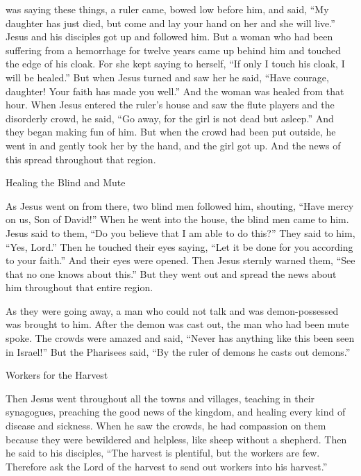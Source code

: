 {was saying
these things,
a ruler
came,
bowed low
before him,
and said,
“My
daughter
has
just
died,
but
come
and lay
your
hand
on
her
and
she will live.”
Jesus
and
his
disciples
got up
and
followed
him.
But
a woman
who had been suffering from a hemorrhage
for twelve
years
came up
behind
him and touched
the edge
of his
cloak.
For
she kept saying
to
herself, “If
only
I touch
his
cloak,
I will be healed.”
But
when Jesus
turned
and
saw
her
he said,
“Have courage,
daughter! Your
faith
has made
you
well.”
And
the woman
was healed
from
that
hour.
When
Jesus
entered
the ruler’s
house
and
saw
the flute players
and
the disorderly
crowd,
he said,
“Go away,
for
the girl
is
not
dead
but
asleep.”
And
they began making fun
of him.
But
when
the crowd
had been put outside,
he went in
and gently took
her
by the hand,
and
the girl
got up.
And
the news
of this
spread
throughout
that
region.
\par }{\SH Healing the Blind and Mute
\par }{\PP {}As Jesus
went on
from there,
two
blind men
followed
him, shouting, “Have mercy
on us,
Son
of David!”
When he went
into
the house,
the blind men
came
to him.
Jesus
said
to them,
“Do you believe
that
I am able
to do
this?” They said
to him,
“Yes,
Lord.”
Then
he touched
their
eyes
saying,
“Let it be done
for you
according to
your
faith.”
And
their
eyes
were opened.
Then
Jesus
sternly warned
them,
“See
that no one
knows about this.”
But
they went out
and spread the news about
him
throughout
that
entire
region.
\par }{\PP {}As
they
were going away,
a man who could not talk
and was demon-possessed
was brought
to him.
After the demon
was cast out,
the man who had been mute
spoke.
The crowds
were amazed
and said,
“Never
has
anything like this
been seen
in
Israel!”
But
the Pharisees
said,
“By
the ruler
of demons
he casts out
demons.”
\par }{\SH Workers for the Harvest
\par }{\PP {}Then
Jesus
went throughout
all
the towns
and
villages,
teaching
in
their
synagogues,
preaching
the good news
of the kingdom,
and
healing
every kind
of disease
and
sickness.
When
he saw
the crowds,
he had compassion
on
them
because
they were
bewildered
and
helpless,
like
sheep
without
a shepherd.
Then
he said
to his
disciples,
“The harvest
is plentiful,
but
the workers
are few.
Therefore
ask
the Lord
of the harvest
to send out
workers
into
his
harvest.”

}
